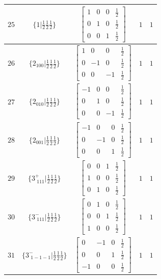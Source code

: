 \documentclass[fleqn,8pt]{jsarticle}
\begin{document}
\begin{longtable}{ccccc}
$ 25 $ & $ \{1|\frac{1}{2} \frac{1}{2} \frac{1}{2}\} $ & $ \begin{bmatrix} 1 & 0 & 0 & \frac{1}{2} \\ 0 & 1 & 0 & \frac{1}{2} \\ 0 & 0 & 1 & \frac{1}{2} \end{bmatrix} $ & $ 1 $ & $ 1 $ \\ \hline
$ 26 $ & $ \{2{}_{100}|\frac{1}{2} \frac{1}{2} \frac{1}{2}\} $ & $ \begin{bmatrix} 1 & 0 & 0 & \frac{1}{2} \\ 0 & -1 & 0 & \frac{1}{2} \\ 0 & 0 & -1 & \frac{1}{2} \end{bmatrix} $ & $ 1 $ & $ 1 $ \\ \hline
$ 27 $ & $ \{2{}_{010}|\frac{1}{2} \frac{1}{2} \frac{1}{2}\} $ & $ \begin{bmatrix} -1 & 0 & 0 & \frac{1}{2} \\ 0 & 1 & 0 & \frac{1}{2} \\ 0 & 0 & -1 & \frac{1}{2} \end{bmatrix} $ & $ 1 $ & $ 1 $ \\ \hline
$ 28 $ & $ \{2{}_{001}|\frac{1}{2} \frac{1}{2} \frac{1}{2}\} $ & $ \begin{bmatrix} -1 & 0 & 0 & \frac{1}{2} \\ 0 & -1 & 0 & \frac{1}{2} \\ 0 & 0 & 1 & \frac{1}{2} \end{bmatrix} $ & $ 1 $ & $ 1 $ \\ \hline
$ 29 $ & $ \{3^{+}_{\,\,111}|\frac{1}{2} \frac{1}{2} \frac{1}{2}\} $ & $ \begin{bmatrix} 0 & 0 & 1 & \frac{1}{2} \\ 1 & 0 & 0 & \frac{1}{2} \\ 0 & 1 & 0 & \frac{1}{2} \end{bmatrix} $ & $ 1 $ & $ 1 $ \\ \hline
$ 30 $ & $ \{3^{-}_{\,\,111}|\frac{1}{2} \frac{1}{2} \frac{1}{2}\} $ & $ \begin{bmatrix} 0 & 1 & 0 & \frac{1}{2} \\ 0 & 0 & 1 & \frac{1}{2} \\ 1 & 0 & 0 & \frac{1}{2} \end{bmatrix} $ & $ 1 $ & $ 1 $ \\ \hline
$ 31 $ & $ \{3^{-}_{\,\,1-1-1}|\frac{1}{2} \frac{1}{2} \frac{1}{2}\} $ & $ \begin{bmatrix} 0 & -1 & 0 & \frac{1}{2} \\ 0 & 0 & 1 & \frac{1}{2} \\ -1 & 0 & 0 & \frac{1}{2} \end{bmatrix} $ & $ 1 $ & $ 1 $ \\ \hline

\end{longtable}
\end{document}

